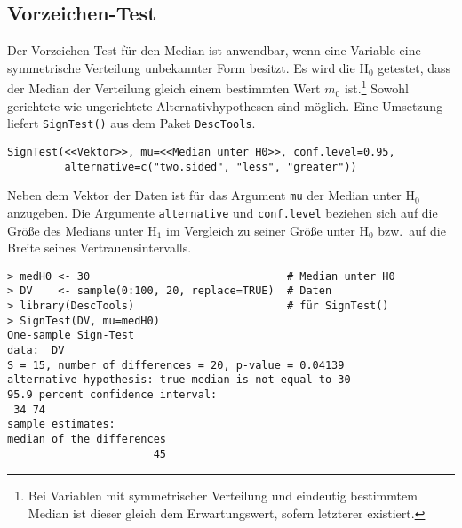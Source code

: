 \subsection{Vorzeichen-Test}
\label{sec:signTest}

Der Vorzeichen-Test für den Median ist anwendbar, wenn eine Variable eine symmetrische Verteilung unbekannter Form besitzt. Es wird die $\text{H}_{0}$ getestet, dass der Median der Verteilung gleich einem bestimmten Wert $m_{0}$ ist.\footnote{Bei Variablen mit symmetrischer Verteilung und eindeutig bestimmtem Median ist dieser gleich dem Erwartungswert, sofern letzterer existiert.} Sowohl gerichtete wie ungerichtete Alternativhypothesen sind möglich. Eine Umsetzung liefert  \lstinline!SignTest()! aus dem Paket \lstinline!DescTools!.
\begin{lstlisting}
SignTest(<<Vektor>>, mu=<<Median unter H0>>, conf.level=0.95,
         alternative=c("two.sided", "less", "greater"))
\end{lstlisting}

Neben dem Vektor der Daten ist für das Argument \lstinline!mu! der Median unter $\text{H}_{0}$ anzugeben. Die Argumente \lstinline!alternative! und \lstinline!conf.level! beziehen sich auf die Größe des Medians unter $\text{H}_{1}$ im Vergleich zu seiner Größe unter $\text{H}_{0}$ bzw.\ auf die Breite seines Vertrauensintervalls.
\begin{lstlisting}
> medH0 <- 30                               # Median unter H0
> DV    <- sample(0:100, 20, replace=TRUE)  # Daten
> library(DescTools)                        # für SignTest()
> SignTest(DV, mu=medH0)
One-sample Sign-Test
data:  DV
S = 15, number of differences = 20, p-value = 0.04139
alternative hypothesis: true median is not equal to 30
95.9 percent confidence interval:
 34 74
sample estimates:
median of the differences
                       45
\end{lstlisting}

